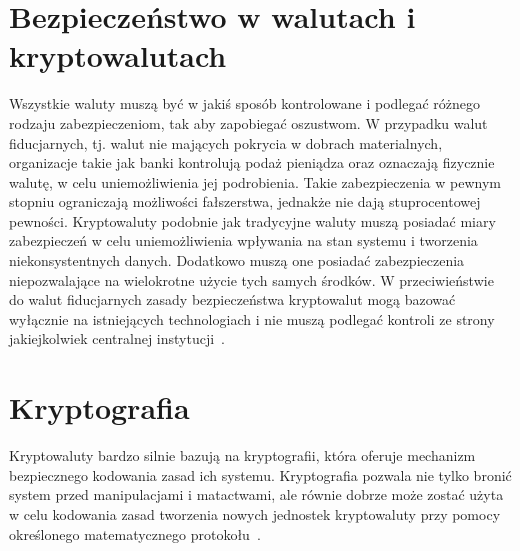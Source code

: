 \documentclass[12pt, oneside, final, openany]{mgr}
\begin{document}
\section{Bezpieczeństwo w walutach i kryptowalutach} \label{sec:bezpieczenstwoWwalutach}
\indent Wszystkie waluty muszą być w jakiś sposób kontrolowane i podlegać różnego rodzaju zabezpieczeniom, tak aby zapobiegać oszustwom. W przypadku walut fiducjarnych, tj. walut nie mających pokrycia w dobrach materialnych, organizacje takie jak banki kontrolują podaż pieniądza oraz oznaczają fizycznie walutę, w celu uniemożliwienia jej podrobienia. Takie zabezpieczenia w pewnym stopniu ograniczają możliwości fałszerstwa, jednakże nie dają stuprocentowej pewności. Kryptowaluty podobnie jak tradycyjne waluty muszą posiadać miary zabezpieczeń w celu uniemożliwienia wpływania na stan systemu i tworzenia niekonsystentnych danych. Dodatkowo muszą one posiadać zabezpieczenia niepozwalające na wielokrotne użycie tych samych środków. W przeciwieństwie do walut fiducjarnych zasady bezpieczeństwa kryptowalut mogą bazować wyłącznie na istniejących technologiach i nie muszą podlegać kontroli ze strony jakiejkolwiek centralnej instytucji~\cite{elektrInstruBezEmitenta}.

\section{Kryptografia} \label{sec:kryptografia}
\indent Kryptowaluty bardzo silnie bazują na kryptografii, która oferuje mechanizm bezpiecznego kodowania zasad ich systemu. Kryptografia pozwala nie tylko bronić system przed manipulacjami i matactwami, ale równie dobrze może zostać użyta w celu kodowania zasad tworzenia nowych jednostek kryptowaluty przy pomocy określonego matematycznego protokołu~\cite{Cryptocurrency}. 
\end{document}

